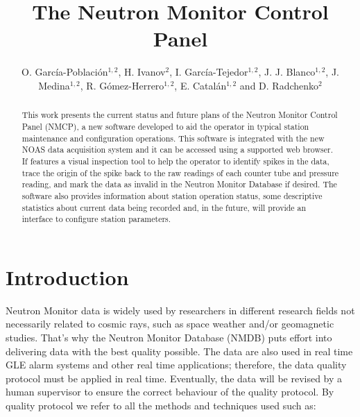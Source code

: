 \documentclass[a4paper]{jpconf}
\begin{document}
\title{The Neutron Monitor Control Panel}

\author{O. García-Población$^{1,2}$, H. Ivanov$^2$, I. García-Tejedor$^{1,2}$,
J. J. Blanco$^{1,2}$, J. Medina$^{1,2}$, R. Gómez-Herrero$^{1,2}$, E.
Catalán$^{1,2}$ and D. Radchenko$^{2}$}

\address{$^1$ Space Research Group, University of Alcalá, Spain}
\address{$^2$ Castilla-La Mancha Neutron Monitor, Parque Tecnológico de Guadalajara, Spain}


\begin{abstract} 
    This work presents the current status and future plans of the
    Neutron Monitor Control Panel (NMCP), a new software developed to aid the
    operator in typical station maintenance and configuration operations. This
    software is integrated with the new NOAS data acquisition system and it can
    be accessed using a supported web browser.  If features a visual inspection
    tool to help the operator to identify spikes in the data, trace the origin
    of the spike back to the raw readings of each counter tube and pressure
    reading, and mark the data as invalid in the Neutron Monitor Database if
    desired. The software also provides information about station operation
    status, some descriptive statistics about current data being recorded and,
    in the future, will provide an interface to configure station parameters.
\end{abstract}

\section{Introduction}

Neutron Monitor data is widely used by researchers in different research fields
not necessarily related to cosmic rays, such as space weather and/or geomagnetic
studies. That's why the Neutron Monitor Database (NMDB)\cite{NMDB2011} puts
effort into delivering data with the best quality possible. The data are also
used in real time GLE alarm systems and other real time applications; therefore,
the data quality protocol must be applied in real time. Eventually, the data
will be revised by a human supervisor to ensure the correct behaviour of the
quality protocol. By quality protocol we refer to all the methods and techniques
used such as:
\end{document}
